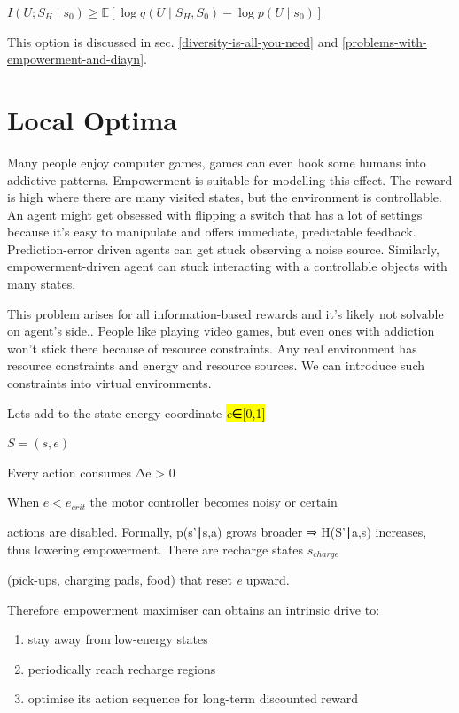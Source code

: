 $I(U;S_H\mid s_0) \ge \mathbb{E}\left[\log q(U \mid S_H,S_0) - \log p(U \mid s_0) \right]$


This option is discussed in sec. \ref{diversity-is-all-you-need} and \ref{problems-with-empowerment-and-diayn}.

\section{Local Optima}\label{local-optima}

Many people enjoy computer games, games can even hook some humans into addictive patterns. Empowerment is suitable for modelling this effect. The reward is high where there are many visited states, but the environment is controllable. An agent might get obsessed with flipping a switch that has a lot of settings because it's easy to manipulate and offers immediate, predictable feedback. Prediction-error driven agents can get stuck observing a noise source. Similarly, empowerment-driven agent can stuck interacting with a controllable objects with many states.

This problem arises for all information-based rewards and it's likely not solvable on agent's side.. People like playing video games, but even ones with addiction won't stick there because of resource constraints. Any real environment has resource constraints and energy and resource sources. We can introduce such constraints into virtual environments.

Lets add to the state energy coordinate \hl{\emph{e}∈{[}0,1{]}}

$S  =  (s, e)$

Every action consumes Δe \textgreater{} 0

When $e < e_{crit}$ the motor controller becomes noisy or certain

actions are disabled. Formally, p(s'∣s,a) grows broader ⇒ H(S'∣a,s) increases, thus lowering empowerment. There are recharge states $s_{charge}$

(pick-ups, charging pads, food) that reset \emph{e} upward.

Therefore empowerment maximiser can obtains an intrinsic drive to:

\begin{enumerate}
	\item stay away from low-energy states
	\item periodically reach recharge regions
	\item optimise its action sequence for long-term discounted reward
\end{enumerate}

